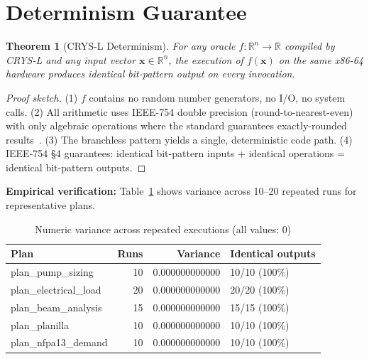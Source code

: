 \documentclass[11pt]{article}
\newtheorem{theorem}{Theorem}
\begin{document}
\section{Determinism Guarantee}

\begin{theorem}[CRYS-L Determinism]
For any oracle $f: \mathbb{R}^n \to \mathbb{R}$ compiled by CRYS-L and any
input vector $\mathbf{x} \in \mathbb{R}^n$, the execution of $f(\mathbf{x})$
on the same x86-64 hardware produces identical bit-pattern output on every invocation.
\end{theorem}

\begin{proof}[Proof sketch]
(1) $f$ contains no random number generators, no I/O, no system calls.
(2) All arithmetic uses IEEE-754 double precision (round-to-nearest-even)
    with only algebraic operations where the standard guarantees exactly-rounded results~\cite{ieee754}.
(3) The branchless pattern yields a single, deterministic code path.
(4) IEEE-754 §4 guarantees: identical bit-pattern inputs + identical operations
    = identical bit-pattern outputs.
\end{proof}

\textbf{Empirical verification:} Table~\ref{tab:determinism} shows variance across
10--20 repeated runs for representative plans.

\begin{table}[h]
\centering
\caption{Numeric variance across repeated executions (all values: 0)}
\label{tab:determinism}
\begin{tabular}{lrrl}
\toprule
\textbf{Plan} & \textbf{Runs} & \textbf{Variance} & \textbf{Identical outputs} \\
\midrule
plan\_pump\_sizing       & 10 & 0.000000000000 & 10/10 (100\%) \\
plan\_electrical\_load   & 20 & 0.000000000000 & 20/20 (100\%) \\
plan\_beam\_analysis     & 15 & 0.000000000000 & 15/15 (100\%) \\
plan\_planilla           & 10 & 0.000000000000 & 10/10 (100\%) \\
plan\_nfpa13\_demand     & 10 & 0.000000000000 & 10/10 (100\%) \\
\bottomrule
\end{tabular}
\end{table}
\end{document}
